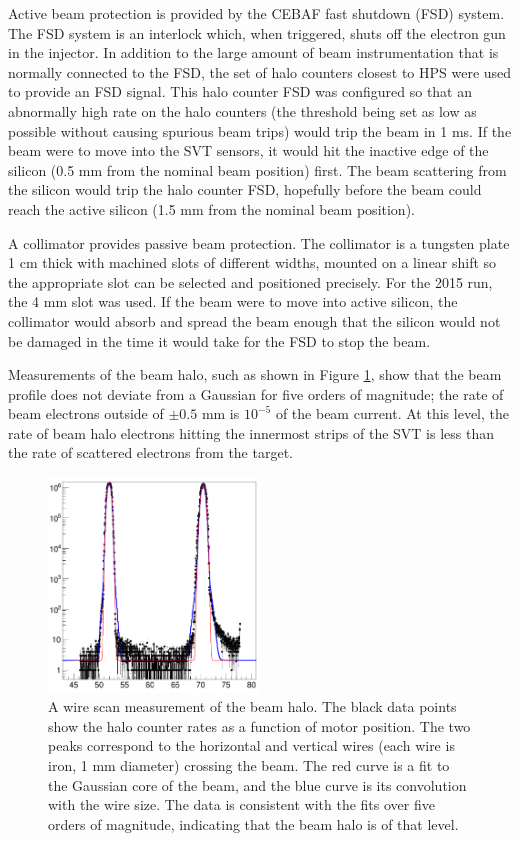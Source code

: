 Active beam protection is provided by the CEBAF fast shutdown (FSD) system.
The FSD system is an interlock which, when triggered, shuts off the electron gun in the injector.
In addition to the large amount of beam instrumentation that is normally connected to the FSD, the set of halo counters closest to HPS were used to provide an FSD signal.
This halo counter FSD was configured so that an abnormally high rate on the halo counters (the threshold being set as low as possible without causing spurious beam trips) would trip the beam in 1 ms.
If the beam were to move into the SVT sensors, it would hit the inactive edge of the silicon (0.5 mm from the nominal beam position) first.
The beam scattering from the silicon would trip the halo counter FSD, hopefully before the beam could reach the active silicon (1.5 mm from the nominal beam position).

A collimator provides passive beam protection.
The collimator is a tungsten plate 1 cm thick with machined slots of different widths, mounted on a linear shift so the appropriate slot can be selected and positioned precisely.
For the 2015 run, the 4 mm slot was used.
If the beam were to move into active silicon, the collimator would absorb and spread the beam enough that the silicon would not be damaged in the time it would take for the FSD to stop the beam.

Measurements of the beam halo, such as shown in Figure \ref{fig:beam-tails}, show that the beam profile does not deviate from a Gaussian for five orders of magnitude; the rate of beam electrons outside of $\pm 0.5$ mm is $10^{-5}$ of the beam current.
At this level, the rate of beam halo electrons hitting the innermost strips of the SVT is less than the rate of scattered electrons from the target.

\begin{figure}[htp]
    \begin{center}
        \includegraphics[width=0.5\textwidth]{detector/figs/beam-tails}
    \end{center}
    \caption{A wire scan measurement of the beam halo.
    The black data points show the halo counter rates as a function of motor position.
    The two peaks correspond to the horizontal and vertical wires (each wire is iron, 1 mm diameter) crossing the beam.
    The red curve is a fit to the Gaussian core of the beam, and the blue curve is its convolution with the wire size.
    The data is consistent with the fits over five orders of magnitude, indicating that the beam halo is of that level.
    }
    \label{fig:beam-tails}
\end{figure}

